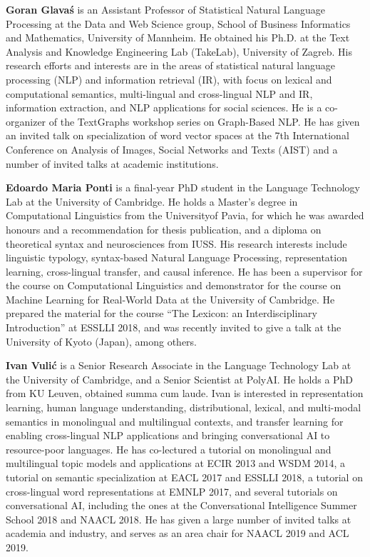 \begin{bio}

\textbf{Goran Glavaś} is an Assistant Professor of Statistical Natural Language Processing at the Data and Web Science group, School of Business Informatics and Mathematics, University of Mannheim. He obtained his Ph.D. at the Text Analysis and Knowledge Engineering Lab (TakeLab), University of Zagreb. His research efforts and interests are in the areas of statistical natural language processing (NLP) and information retrieval (IR), with focus on lexical and computational semantics, multi-lingual and cross-lingual NLP and IR, information extraction, and NLP applications for social sciences. He is a co-organizer of the TextGraphs workshop series on Graph-Based NLP. He has given an invited talk on specialization of word vector spaces at the 7th International Conference on Analysis of Images, Social Networks and Texts (AIST) and a number of invited talks at academic institutions.


\textbf{Edoardo Maria Ponti} is a final-year PhD student in the Language Technology Lab at the University of Cambridge. He holds a Master’s degree in Computational Linguistics from the Universityof Pavia, for which he was awarded honours and a recommendation for thesis publication, and a diploma on theoretical syntax and neurosciences from IUSS. His research interests include linguistic typology, syntax-based Natural Language Processing, representation learning, cross-lingual transfer, and causal inference. He has been a supervisor for the course on Computational Linguistics and demonstrator for the course on Machine Learning for Real-World Data at the University of Cambridge. He prepared the material for the course “The Lexicon: an Interdisciplinary Introduction” at ESSLLI 2018, and was recently invited to give a talk at the University of Kyoto (Japan), among others.


\textbf{Ivan Vulić} is a Senior Research Associate in the Language Technology Lab at the University of Cambridge, and a Senior Scientist at PolyAI. He holds a PhD from KU Leuven, obtained summa cum laude. Ivan is interested in representation learning, human language understanding, distributional, lexical, and multi-modal semantics in monolingual and multilingual contexts, and transfer learning for enabling cross-lingual NLP applications and bringing conversational AI to resource-poor languages. He has co-lectured a tutorial on monolingual and multilingual topic models and applications at ECIR 2013 and WSDM 2014, a tutorial on semantic specialization at EACL 2017 and ESSLLI 2018, a tutorial on cross-lingual word representations at EMNLP 2017, and several tutorials on conversational AI, including the ones at the Conversational Intelligence Summer School 2018 and NAACL 2018. He has given a large number of invited talks at academia and industry, and serves as an area chair for NAACL 2019 and ACL 2019.


\end{bio}